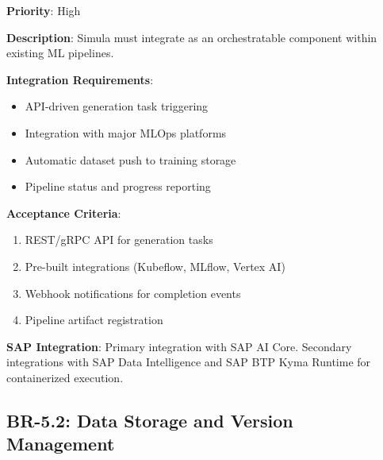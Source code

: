 \documentclass[12pt,a4paper,twoside]{report}
\begin{document}
\begin{tcolorbox}[colback=purple!5,colframe=purple!70,title=BR-5.1: MLOps Pipeline Integration]
\textbf{Priority}: High

\textbf{Description}: Simula must integrate as an orchestratable component within
existing ML pipelines.

\textbf{Integration Requirements}:
\begin{itemize}
\item API-driven generation task triggering
\item Integration with major MLOps platforms
\item Automatic dataset push to training storage
\item Pipeline status and progress reporting
\end{itemize}

\textbf{Acceptance Criteria}:
\begin{enumerate}
\item REST/gRPC API for generation tasks
\item Pre-built integrations (Kubeflow, MLflow, Vertex AI)
\item Webhook notifications for completion events
\item Pipeline artifact registration
\end{enumerate}

\textbf{SAP Integration}: Primary integration with SAP AI Core. Secondary
integrations with SAP Data Intelligence and SAP BTP Kyma Runtime for
containerized execution.
\end{tcolorbox}

\subsection{BR-5.2: Data Storage and Version Management}
\end{document}
